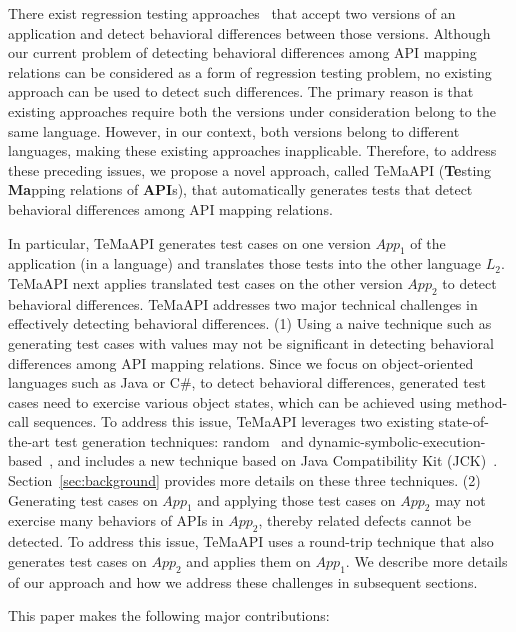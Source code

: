 There exist regression testing approaches~\cite{taneja08diffgen, robert07difference} that accept two versions of an application and detect behavioral differences between those versions. Although our current problem of detecting behavioral differences among API mapping relations can be considered as a form of regression testing problem, no existing approach can be used to detect such differences. The primary reason is that existing approaches require both the versions under consideration belong to the same language. However, in our context, both versions belong to different languages, making these existing approaches inapplicable. Therefore, to address these preceding issues, we propose a novel approach, called TeMaAPI (\textbf{Te}sting \textbf{Ma}pping relations of \textbf{API}s), that automatically generates tests that detect behavioral differences among API mapping relations.

In particular, TeMaAPI generates test cases on one version $App_1$ of the application (in a language) and translates those tests into the other language $L_2$. TeMaAPI next applies translated test cases on the other version $App_2$ to detect behavioral differences. TeMaAPI addresses two major technical challenges in effectively detecting behavioral differences. (1) Using a naive technique such as generating test cases with  values may not be significant in detecting behavioral differences among API mapping relations. Since we focus on object-oriented languages such as Java or C\#, to detect behavioral differences, generated test cases need to exercise various object states, which can be achieved using method-call sequences. To address this issue, TeMaAPI leverages two existing state-of-the-art test generation techniques: random~\cite{pacheco2007feedback} and dynamic-symbolic-execution-based~\cite{koushik:cute, godefroid:dart, tillmann2008pex}, and includes a new technique based on Java Compatibility Kit (JCK)~\cite{JCK}. Section~\ref{sec:background} provides more details on these three techniques. (2) Generating test cases on $App_1$ and applying those test cases on $App_2$ may not exercise many behaviors of APIs in $App_2$, thereby related defects cannot be detected. To address this issue, TeMaAPI uses a round-trip technique that also generates test cases on $App_2$ and applies them on $App_1$. We describe more details of our approach and how we address these challenges in subsequent sections.

This paper makes the following major contributions:

